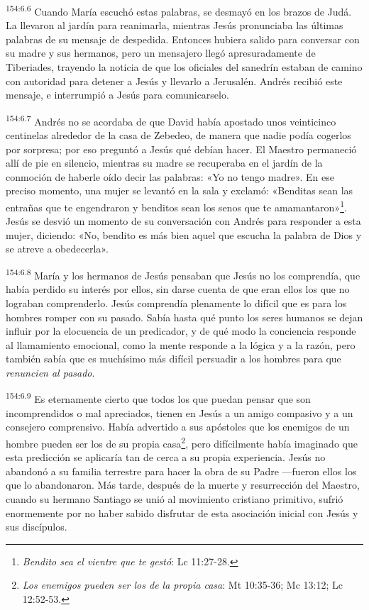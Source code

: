 \par
\textsuperscript{154:6.6} Cuando María escuchó estas palabras, se desmayó en los brazos de Judá. La llevaron al jardín para reanimarla, mientras Jesús pronunciaba las últimas palabras de su mensaje de despedida. Entonces hubiera salido para conversar con su madre y sus hermanos, pero un mensajero llegó apresuradamente de Tiberiades, trayendo la noticia de que los oficiales del sanedrín estaban de camino con autoridad para detener a Jesús y llevarlo a Jerusalén. Andrés recibió este mensaje, e interrumpió a Jesús para comunicarselo.

\par
\textsuperscript{154:6.7} Andrés no se acordaba de que David había apostado unos veinticinco centinelas alrededor de la casa de Zebedeo, de manera que nadie podía cogerlos por sorpresa; por eso preguntó a Jesús qué debían hacer. El Maestro permaneció allí de pie en silencio, mientras su madre se recuperaba en el jardín de la conmoción de haberle oído decir las palabras: «Yo no tengo madre». En ese preciso momento, una mujer se levantó en la sala y exclamó: «Benditas sean las entrañas que te engendraron y benditos sean los senos que te amamantaron»\footnote{\textit{Bendito sea el vientre que te gestó}: Lc 11:27-28.}. Jesús se desvió un momento de su conversación con Andrés para responder a esta mujer, diciendo: «No, bendito es más bien aquel que escucha la palabra de Dios y se atreve a obedecerla».

\par
\textsuperscript{154:6.8} María y los hermanos de Jesús pensaban que Jesús no los comprendía, que había perdido su interés por ellos, sin darse cuenta de que eran ellos los que no lograban comprenderlo. Jesús comprendía plenamente lo difícil que es para los hombres romper con su pasado. Sabía hasta qué punto los seres humanos se dejan influir por la elocuencia de un predicador, y de qué modo la conciencia responde al llamamiento emocional, como la mente responde a la lógica y a la razón, pero también sabía que es muchísimo más difícil persuadir a los hombres para que \textit{renuncien al pasado}.

\par
\textsuperscript{154:6.9} Es eternamente cierto que todos los que puedan pensar que son incomprendidos o mal apreciados, tienen en Jesús a un amigo compasivo y a un consejero comprensivo. Había advertido a sus apóstoles que los enemigos de un hombre pueden ser los de su propia casa\footnote{\textit{Los enemigos pueden ser los de la propia casa}: Mt 10:35-36; Mc 13:12; Lc 12:52-53.}, pero difícilmente había imaginado que esta predicción se aplicaría tan de cerca a su propia experiencia. Jesús no abandonó a su familia terrestre para hacer la obra de su Padre ---fueron ellos los que lo abandonaron. Más tarde, después de la muerte y resurrección del Maestro, cuando su hermano Santiago se unió al movimiento cristiano primitivo, sufrió enormemente por no haber sabido disfrutar de esta asociación inicial con Jesús y sus discípulos.

